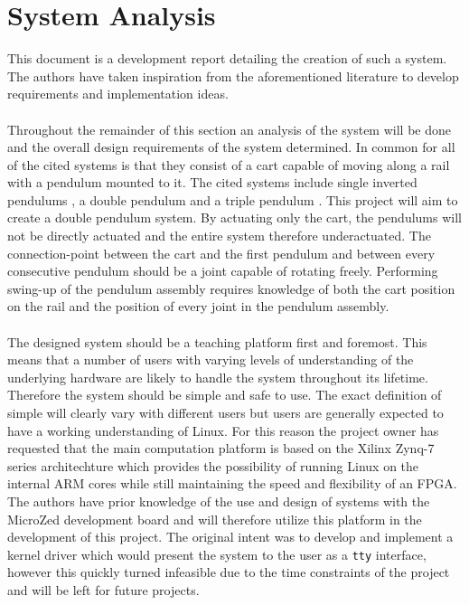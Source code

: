 \section{System Analysis}
This document is a development report detailing the creation of such a system.
The authors have taken inspiration from the aforementioned literature to develop requirements and implementation ideas.
\\~\\
Throughout the remainder of this section an analysis of the system will be done and the overall design requirements of the system determined.
In common for all of the cited systems is that they consist of a cart capable of moving along a rail with a pendulum mounted to it.
The cited systems include single inverted pendulums \cite{invertpendulum1} \cite{invertpendulum3}, a double pendulum \cite{doubleinvertpendulum} and a triple pendulum \cite{tripleinvertpendulum}.
This project will aim to create a double pendulum system.
By actuating only the cart, the pendulums will not be directly actuated and the entire system therefore underactuated.
The connection-point between the cart and the first pendulum and between every consecutive pendulum should be a joint capable of rotating freely.
Performing swing-up of the pendulum assembly requires knowledge of both the cart position on the rail and the position of every joint in the pendulum assembly.  
\\~\\
The designed system should be a teaching platform first and foremost.
This means that a number of users with varying levels of understanding of the underlying hardware are likely to handle the system throughout its lifetime.
Therefore the system should be simple and safe to use.
The exact definition of simple will clearly vary with different users but users are generally expected to have a working understanding of Linux.
For this reason the project owner has requested that the main computation platform is based on the Xilinx Zynq-7 series architechture which provides the possibility of running Linux on the internal ARM cores while still maintaining the speed and flexibility of an FPGA.
The authors have prior knowledge of the use and design of systems with the MicroZed development board and will therefore utilize this platform in the development of this project. 
The original intent was to develop and implement a kernel driver which would present the system to the user as a \texttt{tty} interface, however this quickly turned infeasible due to the time constraints of the project and will be left for future projects.
